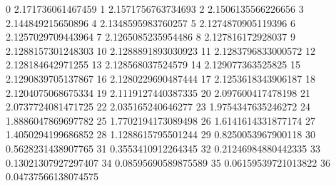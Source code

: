 0 2.171736061467459
1 2.1571756763734693
2 2.1506135566226656
3 2.144849215650896
4 2.1348595983760257
5 2.1274870905119396
6 2.1257029709443964
7 2.1265085235954486
8 2.127816172928037
9 2.1288157301248303
10 2.1288891893030923
11 2.1283796833000572
12 2.128184642971255
13 2.128568037524579
14 2.129077363525825
15 2.1290839705137867
16 2.1280229690487444
17 2.1253618343906187
18 2.1204075068675334
19 2.1119127440387335
20 2.097600417478198
21 2.0737724081471725
22 2.035165240646277
23 1.9754347635246272
24 1.8886047869697782
25 1.7702194173089498
26 1.6141614331877174
27 1.4050294199686852
28 1.1288615795501244
29 0.8250053967900118
30 0.5628231438907765
31 0.3553410912264345
32 0.21246984880442335
33 0.13021307927297407
34 0.08595690589875589
35 0.06159539721013822
36 0.04737566138074575
